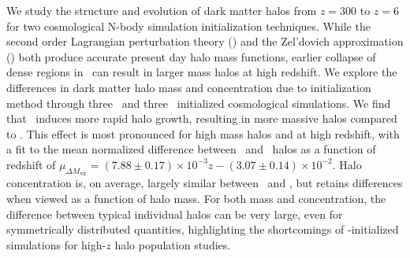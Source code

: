 
%
%
%
%


We study the structure and evolution of dark matter halos from $z = 300$ to $z = 6$ for two cosmological N-body simulation initialization techniques.  While the second order Lagrangian perturbation theory (\lpt) and the Zel'dovich approximation (\za) both produce accurate present day halo mass functions, earlier collapse of dense regions in \lpt\ can result in larger mass halos at high redshift.  We explore the differences in dark matter halo mass and concentration due to initialization method through three \lpt\ and three \za\ initialized cosmological simulations.  We find that \lpt\ induces more rapid halo growth, resulting in more massive halos compared to \za.  This effect is most pronounced for high mass halos and at high redshift, with a fit to the mean normalized difference between \lpt\ and \za\ halos as a function of redshift of $\mu_{\Delta M_{\mathrm{vir}}} = (7.88 \pm 0.17) \times 10^{-3} z - (3.07 \pm 0.14) \times 10^{-2}$.  Halo concentration is, on average, largely similar between \lpt\ and \za, but retains differences when viewed as a function of halo mass.  For both mass and concentration, the difference between typical individual halos can be very large, even for symmetrically distributed quantities, highlighting the shortcomings of \za-initialized simulations for high-$z$ halo population studies.




